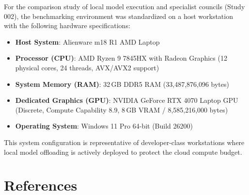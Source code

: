 \documentclass[12pt]{article}
\begin{document}
For the comparison study of local model execution and specialist councils (Study 002), the benchmarking environment was standardized on a host workstation with the following hardware specifications:

\begin{itemize}
  \item \textbf{Host System}: Alienware m18 R1 AMD Laptop
  \item \textbf{Processor (CPU)}: AMD Ryzen 9 7845HX with Radeon Graphics (12 physical cores, 24 threads, AVX/AVX2 support)
  \item \textbf{System Memory (RAM)}: 32\,GB DDR5 RAM (33,487,876,096 bytes)
  \item \textbf{Dedicated Graphics (GPU)}: NVIDIA GeForce RTX 4070 Laptop GPU (Discrete, Compute Capability 8.9, 8\,GB VRAM / 8,585,216,000 bytes)
  \item \textbf{Operating System}: Windows 11 Pro 64-bit (Build 26200)
\end{itemize}

This system configuration is representative of developer-class workstations where local model offloading is actively deployed to protect the cloud compute budget.

\section*{References}
\end{document}
